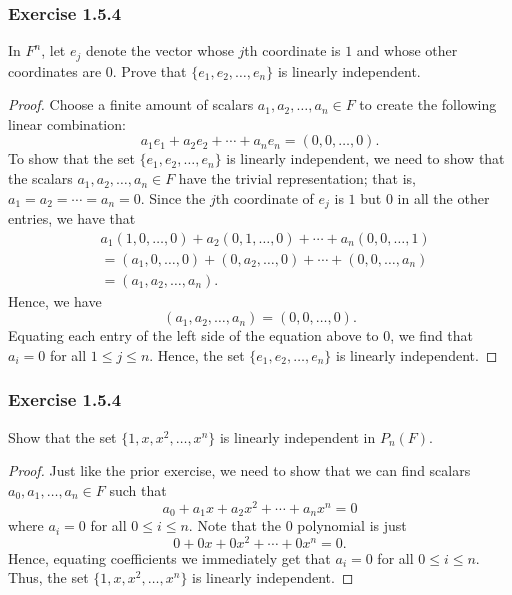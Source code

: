 \subsubsection{Exercise 1.5.4} In \( F^{n}  \), let \( e_{j}  \) denote the vector whose \( j \)th coordinate is \( 1  \) and whose other coordinates are \( 0  \). Prove that \( \{ e_{1}, e_{2}, \dots, e_{n}  \}  \) is linearly independent.
\begin{proof}
    Choose a finite amount of scalars \( a_{1}, a_{2}, \dots, a_{n} \in F  \) to create the following linear combination:
    \[  a_{1} e_{1} + a_{2} e_{2} + \cdots + a_{n} e_{n} = (0,0, \dots, 0). \tag{1} \]
    To show that the set \( \{ e_{1} ,e_{2}, \dots, e_{n}  \}  \) is linearly independent, we need to show that the scalars \( a_{1}, a_{2}, \dots, a_{n} \in F  \) have the trivial representation; that is, \( a_{1} = a_{2} = \cdots = a_{n} = 0  \).
    Since the \( j \)th coordinate of \( e_{j} \) is \( 1  \) but \( 0 \) in all the other entries, we have that 
    \begin{align*}
        &a_{1} (1,0,\dots, 0) + a_{2} (0,1,\dots,0) + \cdots + a_{n} (0,0, \dots, 1 )    \\
        &= (a_{1}, 0, \dots, 0  ) + (0 , a_{2}, \dots, 0 ) + \cdots + (0,0, \dots, a_{n}) \\
        &= (a_{1}, a_{2}, \dots , a_{n}  ).
    \end{align*}
    Hence, we have 
    \[  (a_{1}, a_{2} , \dots, a_{n} ) = (0,0, \dots, 0). \]
    Equating each entry of the left side of the equation above to \( 0 \), we find that \( a_{i} = 0  \) for all \( 1 \leq j \leq n  \). Hence, the set \( \{ e_{1}, e_{2}, \dots, e_{n}  \}  \) is linearly independent.
\end{proof}


\subsubsection{Exercise 1.5.4} Show that the set \( \{ 1,x, x^{2}, \dots, x^{n}  \}  \) is linearly independent in \( P_{n}(F) \).
\begin{proof}
    Just like the prior exercise, we need to show that we can find scalars \( a_{0}, a_{1}, \dots, a_{n} \in F  \)  such that 
    \[  a_{0} + a_{1} x + a_{2} x^{2} + \cdots + a_{n} x^{n} = 0   \]
    where \( a_{i} = 0  \) for all \( 0 \leq i \leq n \). Note that the \( 0  \) polynomial is just 
    \[  0 + 0 x + 0 x^{2} + \cdots + 0 x^{n} = 0.  \]
    Hence, equating coefficients we immediately get that \( a_{i} = 0  \) for all \( 0 \leq i \leq n \). Thus, the set \( \{ 1 , x , x^{2}, \dots, x^{n} \}  \)  is linearly independent. 
\end{proof}

